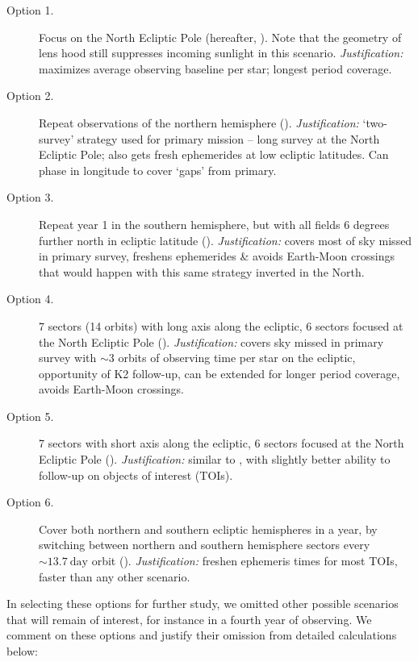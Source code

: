 \begin{description}
	\item[Option 1.] Focus on the North Ecliptic Pole (hereafter, \npole). Note that the geometry of \tesss lens hood still suppresses incoming sunlight in this scenario. 
	\textit{Justification:} maximizes average observing baseline per star; longest period coverage.
	\item[Option 2.] Repeat observations of the northern hemisphere (\nhemi).
	\textit{Justification:} `two-survey' strategy used for primary mission -- long survey at the North Ecliptic Pole; also gets fresh ephemerides at low ecliptic latitudes. Can phase in longitude to cover `gaps' from primary.
	\item[Option 3.] Repeat year 1 in the southern hemisphere, but with all fields 6 degrees further north in ecliptic latitude (\shemiAvoid).
	\textit{Justification:} covers most of sky missed in primary survey, freshens ephemerides \& avoids Earth-Moon crossings that would happen with this same strategy inverted in the North.
	\item[Option 4.] 7 sectors (14 orbits) with \tesss long axis along the ecliptic, 6 sectors focused at the North Ecliptic Pole (\elong).
	\textit{Justification:} covers sky missed in primary survey with $\sim3$ orbits of observing time per star on the ecliptic, opportunity of K2 follow-up, can be extended for longer period coverage, avoids Earth-Moon crossings.
	\item[Option 5.] 7 sectors with \tesss short axis along the ecliptic, 6 sectors focused at the North Ecliptic Pole (\eshort). 
	\textit{Justification:} similar to \elong, with slightly better ability to follow-up on \tess objects of interest (TOIs).
	\item[Option 6.] Cover both northern and southern ecliptic hemispheres in a year, by switching between northern and southern hemisphere sectors every $\sim13.7\ \text{day}$ orbit (\hemis).
	\textit{Justification:} freshen ephemeris times for most TOIs, faster than any other scenario.
\end{description}

In selecting these options for further study, we omitted other possible scenarios that will remain of interest, for instance in a fourth year of observing. We comment on these options and justify their omission from detailed calculations below:

